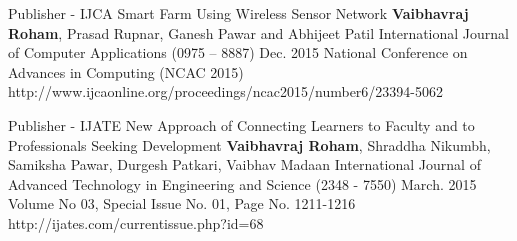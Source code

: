


\begin{cventries}

  \cvpublicationentry
    {Publisher - IJCA} %
    {Smart Farm Using Wireless Sensor Network} %
    {\textbf{Vaibhavraj Roham}, Prasad Rupnar, Ganesh Pawar and Abhijeet Patil} %
    {International Journal of Computer Applications (0975 – 8887)}
    {Dec. 2015} %
    {National Conference on Advances in Computing (NCAC 2015)}
    {http://www.ijcaonline.org/proceedings/ncac2015/number6/23394-5062}
    

  \cvpublicationentry
    {Publisher - IJATE} %
    {New Approach of Connecting Learners to Faculty and to Professionals Seeking Development} %
    {\textbf{Vaibhavraj Roham}, Shraddha Nikumbh, Samiksha Pawar, Durgesh Patkari, Vaibhav Madaan} %
    {International Journal of Advanced Technology in Engineering and Science (2348 - 7550)}
    {March. 2015} %
    { Volume No 03, Special Issue No. 01, Page No. 1211-1216}
    {http://ijates.com/currentissue.php?id=68}
    

\end{cventries}
